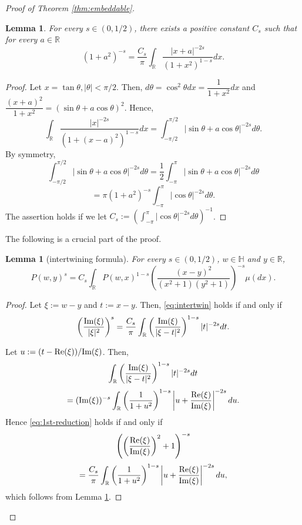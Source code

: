 \documentclass[journal]{IEEEtran}
\newtheorem{lemma}[theorem]{Lemma}
\begin{document}
\begin{proof}[Proof of Theorem \ref{thm:embeddable}]
\begin{lemma}\label{lem:intertwin-pre}
For every $s \in (0,1/2)$, there exists a positive constant $C_s$ such that for every $a \in \mathbb R$ 
\[ (1+a^2)^{-s} = \frac{C_s}{\pi} \int_{\mathbb R} \frac{|x+a|^{-2s}}{(1+x^2)^{1-s}} dx. \]
\end{lemma}

\begin{proof}
Let $x = \tan \theta, |\theta| < \pi/2$. 
Then, $d\theta = \cos^2 \theta dx = \dfrac{1}{1+x^2} dx$ and  
$\dfrac{(x+a)^{2}}{1+x^2} = (\sin \theta + a \cos \theta)^2$. 
Hence, 
\[ \int_{\mathbb R} \frac{|x|^{-2s}}{(1+(x-a)^2)^{1-s}} dx = \int_{-\pi/2}^{\pi/2} \left| \sin \theta + a \cos \theta \right|^{-2s} d\theta. \]
By symmetry, 
\[ \int_{-\pi/2}^{\pi/2} \left| \sin \theta + a \cos \theta \right|^{-2s} d\theta = \frac{1}{2} \int_{-\pi}^{\pi} \left| \sin \theta + a \cos \theta \right|^{-2s} d\theta \]
\[= \pi (1+a^2)^{-s} \int_{-\pi}^{\pi} \left| \cos \theta \right|^{-2s} d\theta. \]
The assertion holds if we let $C_s := \left( \int_{-\pi}^{\pi} \left| \cos \theta \right|^{-2s} d\theta \right)^{-1}$. 
\end{proof}

The following is a crucial part of the proof. 

\begin{lemma}[intertwining formula]\label{lem:intertwin}
For every $s \in (0,1/2)$, $w \in \mathbb H$ and $y \in \mathbb R$, 
\begin{equation}\label{eq:intertwin} 
P(w,y)^{s} = C_s \int_{\mathbb R} P(w,x)^{1-s} \left( \frac{(x-y)^2}{(x^2 + 1) (y^2 + 1)} \right)^{-s} \mu(dx). 
\end{equation} 
\end{lemma}

\begin{proof}
Let $\xi := w - y$ and $t := x-y$. 
Then, \eqref{eq:intertwin} holds if and only if 
\begin{equation}\label{eq:1st-reduction}
\left(\frac{\textup{Im}(\xi)}{|\xi|^2}\right)^s  = \frac{C_s}{\pi} \int_{\mathbb R} \left( \frac{\textup{Im}(\xi)}{|\xi - t|^2} \right)^{1-s} |t|^{-2s} dt. 
\end{equation}

Let $u := (t - \textup{Re}(\xi))/\textup{Im}(\xi)$. 
Then, 
\[ \int_{\mathbb R} \left( \frac{\textup{Im}(\xi)}{|\xi - t|^2} \right)^{1-s} |t|^{-2s} dt \]
\[= (\textup{Im}(\xi))^{-s} \int_{\mathbb R} \left(\frac{1}{1+u^2}\right)^{1-s} \left| u + \frac{\textup{Re}(\xi)}{\textup{Im}(\xi)} \right|^{-2s} du. \]
Hence \eqref{eq:1st-reduction} holds if and only if 
\[ \left( \left( \frac{\textup{Re}(\xi)}{\textup{Im}(\xi)} \right)^2+ 1 \right)^{-s} \]
\[= \frac{C_s}{\pi} \int_{\mathbb R} \left(\frac{1}{1+u^2}\right)^{1-s} \left| u + \frac{\textup{Re}(\xi)}{\textup{Im}(\xi)} \right|^{-2s} du, \]
which follows from Lemma \ref{lem:intertwin-pre}. 
\end{proof}


\end{proof}
\end{document}
